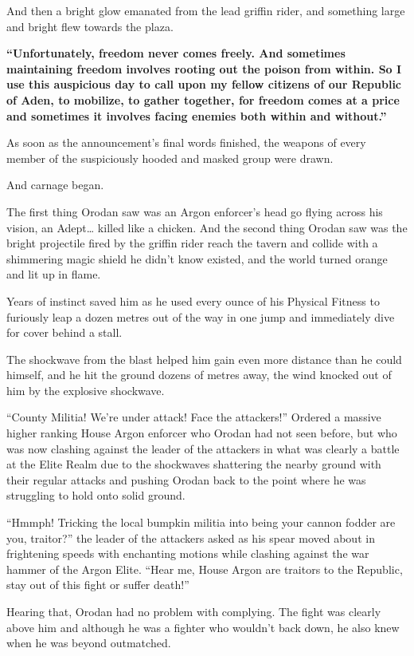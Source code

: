 \documentclass[a4paper,10pt]{book}
\begin{document}
And then a bright glow emanated from the lead griffin rider, and something large and bright flew towards the plaza.\par
\textbf{“Unfortunately, freedom never comes freely. And sometimes maintaining freedom involves rooting out the poison from within. So I use this auspicious day to call upon my fellow citizens of our Republic of Aden, to mobilize, to gather together, for freedom comes at a price and sometimes it involves facing enemies both within and without.”}\par
As soon as the announcement’s final words finished, the weapons of every member of the suspiciously hooded and masked group were drawn.\par
And carnage began.\par
The first thing Orodan saw was an Argon enforcer’s head go flying across his vision, an Adept… killed like a chicken. And the second thing Orodan saw was the bright projectile fired by the griffin rider reach the tavern and collide with a shimmering magic shield he didn’t know existed, and the world turned orange and lit up in flame.\par
Years of instinct saved him as he used every ounce of his Physical Fitness to furiously leap a dozen metres out of the way in one jump and immediately dive for cover behind a stall.\par
The shockwave from the blast helped him gain even more distance than he could himself, and he hit the ground dozens of metres away, the wind knocked out of him by the explosive shockwave.\par
“County Militia! We’re under attack! Face the attackers!” Ordered a massive higher ranking House Argon enforcer who Orodan had not seen before, but who was now clashing against the leader of the attackers in what was clearly a battle at the Elite Realm due to the shockwaves shattering the nearby ground with their regular attacks and pushing Orodan back to the point where he was struggling to hold onto solid ground.\par
“Hmmph! Tricking the local bumpkin militia into being your cannon fodder are you, traitor?” the leader of the attackers asked as his spear moved about in frightening speeds with enchanting motions while clashing against the war hammer of the Argon Elite. “Hear me, House Argon are traitors to the Republic, stay out of this fight or suffer death!”\par
Hearing that, Orodan had no problem with complying. The fight was clearly above him and although he was a fighter who wouldn’t back down, he also knew when he was beyond outmatched.\par
\end{document}
